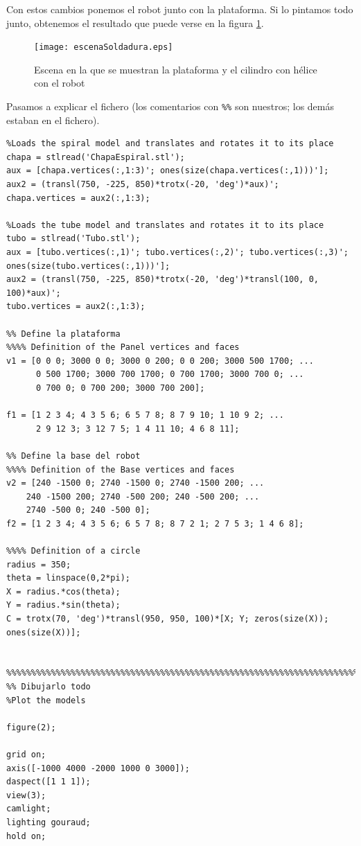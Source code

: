 \documentclass{article}
\newcommand{\fref}[1]{figura \ref{fig:#1}}
\begin{document}
Con estos cambios ponemos el robot junto con la plataforma. Si lo pintamos todo junto, obtenemos el resultado que puede verse en la \fref{escsol}.

\begin{figure}[h]
\centering
\texttt{[image: escenaSoldadura.eps]}
\caption{Escena en la que se muestran la plataforma y el cilindro con hélice con el robot}
\label{fig:escsol}
\end{figure}

Pasamos a explicar el fichero (los comentarios con {\tt \%\%} son nuestros; los demás estaban en el fichero).
\begin{lstlisting}[frame=single]
%% Carga los ficheros del tubo y el espiral
%Loads the spiral model and translates and rotates it to its place
chapa = stlread('ChapaEspiral.stl');
aux = [chapa.vertices(:,1:3)'; ones(size(chapa.vertices(:,1)))'];
aux2 = (transl(750, -225, 850)*trotx(-20, 'deg')*aux)';
chapa.vertices = aux2(:,1:3);

%Loads the tube model and translates and rotates it to its place
tubo = stlread('Tubo.stl');
aux = [tubo.vertices(:,1)'; tubo.vertices(:,2)'; tubo.vertices(:,3)'; ones(size(tubo.vertices(:,1)))'];
aux2 = (transl(750, -225, 850)*trotx(-20, 'deg')*transl(100, 0, 100)*aux)';
tubo.vertices = aux2(:,1:3);

%% Define la plataforma
%%%% Definition of the Panel vertices and faces  
v1 = [0 0 0; 3000 0 0; 3000 0 200; 0 0 200; 3000 500 1700; ...
      0 500 1700; 3000 700 1700; 0 700 1700; 3000 700 0; ...
      0 700 0; 0 700 200; 3000 700 200];

f1 = [1 2 3 4; 4 3 5 6; 6 5 7 8; 8 7 9 10; 1 10 9 2; ...
      2 9 12 3; 3 12 7 5; 1 4 11 10; 4 6 8 11];

%% Define la base del robot
%%%% Definition of the Base vertices and faces 
v2 = [240 -1500 0; 2740 -1500 0; 2740 -1500 200; ...
    240 -1500 200; 2740 -500 200; 240 -500 200; ...
    2740 -500 0; 240 -500 0];
f2 = [1 2 3 4; 4 3 5 6; 6 5 7 8; 8 7 2 1; 2 7 5 3; 1 4 6 8];

%%%% Definition of a circle 
radius = 350;      
theta = linspace(0,2*pi);          
X = radius.*cos(theta);  
Y = radius.*sin(theta);  
C = trotx(70, 'deg')*transl(950, 950, 100)*[X; Y; zeros(size(X)); ones(size(X))];


%%%%%%%%%%%%%%%%%%%%%%%%%%%%%%%%%%%%%%%%%%%%%%%%%%%%%%%%%%%%%%%%%%%%%%%%%%%
%% Dibujarlo todo
%Plot the models

figure(2);

grid on;
axis([-1000 4000 -2000 1000 0 3000]);
daspect([1 1 1]);
view(3); 
camlight;
lighting gouraud;
hold on;


\end{lstlisting}
\end{document}
